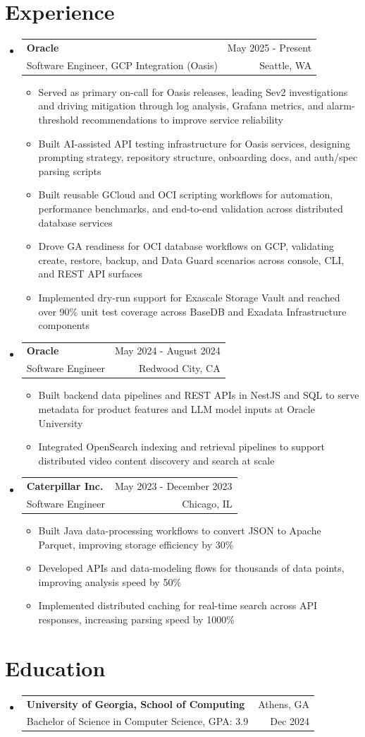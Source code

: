 \documentclass[letterpaper,11pt]{article}
\makeatletter
\newcommand{\resumeItem}[1]{
  \item\small{
    {#1 \vspace{-1pt}}
  }
}
\newcommand{\resumeSubheading}[4]{
  \vspace{-2pt}\item
    \begin{tabular*}{0.97\textwidth}[t]{l@{\extracolsep{\fill}}r}
      \textbf{#1} & #2 \\
      {\small#3} & {\small #4} \\
    \end{tabular*}\vspace{-7pt}
}
\newcommand{\resumeSubHeadingListStart}{\begin{itemize}[leftmargin=0.15in, label={}]}
\newcommand{\resumeSubHeadingListEnd}{\end{itemize}}
\newcommand{\resumeItemListStart}{\begin{itemize}[leftmargin=0.18in,itemsep=1pt,topsep=2pt]}
\newcommand{\resumeItemListEnd}{\end{itemize}\vspace{-5pt}}
\makeatother
\begin{document}
\section{Experience}
  \resumeSubHeadingListStart

    \resumeSubheading
  {Oracle}{May 2025 - Present}
  {Software Engineer, GCP Integration (Oasis)}{Seattle, WA}
  \resumeItemListStart
    \resumeItem{Served as primary on-call for Oasis releases, leading Sev2 investigations and driving mitigation through log analysis, Grafana metrics, and alarm-threshold recommendations to improve service reliability}
    \resumeItem{Built AI-assisted API testing infrastructure for Oasis services, designing prompting strategy, repository structure, onboarding docs, and auth/spec parsing scripts}
    \resumeItem{Built reusable GCloud and OCI scripting workflows for automation, performance benchmarks, and end-to-end validation across distributed database services}
    \resumeItem{Drove GA readiness for OCI database workflows on GCP, validating create, restore, backup, and Data Guard scenarios across console, CLI, and REST API surfaces}
    \resumeItem{Implemented dry-run support for Exascale Storage Vault and reached over 90\% unit test coverage across BaseDB and Exadata Infrastructure components}
  \resumeItemListEnd

    \resumeSubheading
      {Oracle}{May 2024 - August 2024}
      {Software Engineer}{Redwood City, CA}
      \resumeItemListStart
        \resumeItem{Built backend data pipelines and REST APIs in NestJS and SQL to serve metadata for product features and LLM model inputs at Oracle University}
        \resumeItem{Integrated OpenSearch indexing and retrieval pipelines to support distributed video content discovery and search at scale}
      \resumeItemListEnd

    \resumeSubheading
      {Caterpillar Inc.}{May 2023 - December 2023}
      {Software Engineer}{Chicago, IL}
      \resumeItemListStart
        \resumeItem{Built Java data-processing workflows to convert JSON to Apache Parquet, improving storage efficiency by 30\%}
        \resumeItem{Developed APIs and data-modeling flows for thousands of data points, improving analysis speed by 50\%}
        \resumeItem{Implemented distributed caching for real-time search across API responses, increasing parsing speed by 1000\%}
      \resumeItemListEnd

  \resumeSubHeadingListEnd

\section{Education}
  \resumeSubHeadingListStart
    \resumeSubheading
      {University of Georgia, School of Computing}{Athens, GA}
      {Bachelor of Science in Computer Science, GPA: 3.9}{Dec 2024}
  \resumeSubHeadingListEnd
\end{document}
